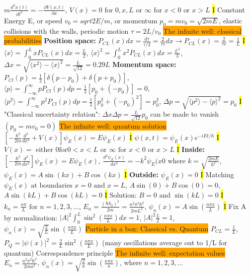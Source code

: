 \documentclass[fontsize=4pt]{scrartcl}
\begin{document}
$m\frac{d^2 x(t)}{dt^2} = -\frac{\partial V(x,t)}{\partial x}$, $V(x) = 0 \text{ for } 0,x,L \text{ or } \infty \text{ for } x<0 \text { or } x > L$
\hl{I} Constant Energy E, or speed $v_0 = sqrt{2E/m}$, or momentum $p_0 = mv_0 = \sqrt{2mE}$, elastic collisions with the walls, periodic motion $\tau = 2L/v_0$
\colorbox{Orange}{The infinite well: classical probabilities}
\textbf{Position space: }
$P_{CL}(x)dx = \frac{d\tau}{\tau / 2} = \frac{2}{\tau v}dx \rightarrow P_{CL}(x) = \frac{2}{\tau v} = \frac{1}{L}$
\hl{I}
$\langle x \rangle = \int_{0}^{L} x P_{CL}(x)dx = \frac{L}{2}$, $\langle x \rangle^2 = \int_{0}^{L} x^2 P_{CL}(x)dx = \frac{L^2}{3}$, $\Delta x = \sqrt{\langle x^2 \rangle -\langle x \rangle^2} = \frac{L}{\sqrt{12}} = 0.29 L$ 
\textbf{Momentum space: }
$P_{Cl}(p) = \frac{1}{2}[\delta(p-p_0)+\delta(p+p_0)]$, $ \langle p \rangle = \int_{-\infty}^{\infty} p P_{Cl}(p)dp = \frac{1}{2}[p_0 + (-p_0)] = 0$, $ \langle p^2 \rangle = \int_{-\infty}^{\infty} p^2 P_{Cl}(p)dp = \frac{1}{2}[p_0^2 + (-p_0)^2] = p_0^2$, $\Delta p = \sqrt{\langle p^2 \rangle - \langle p \rangle^2} = p_0$
\hl{I}
"Classical uncertainty relation": $\Delta x \Delta p = \frac{L}{\sqrt{12}}p_0$ can be made to vanish $(p_0 = mv_0 = 0)$
\colorbox{Orange}{The infinite well: quantum solution}
$[-\frac{\hbar^2}{2m}\frac{d^2}{dx^2}+V(x)]\psi_E(x) = E\psi_E(x)$
\hl{I}
$\psi(x,t) = \psi_{E} (x) e^{-iEt/\hbar}$
\hl{I}
$V(x) = \text{ either } 0 \text {for} 0 < x < L \text{ or } \infty \text{ for } x < 0 \text{ or } x > L$
\hl{I}
\textbf{Inside:} $[-\frac{\hbar^2}{2m}\frac{d^2}{dx^2}]\psi_E  (x) = E\psi_E (x)$, $\frac{d^2 \psi_{E}(x)}{dx^2} = - k^2 \psi_E (x0 \text{ where } k = \sqrt{\frac{2mE}{\hbar^2}}$, $\psi_E(x) = A\sin(kx) + B\cos(kx)$
\hl{I}
\textbf{Outside:} $\psi_E(x) = 0$
\hl{I}
Matching $\psi_E(x) \text { at boundaries } x=0 \text{ and } x=L$, $A\sin(0) + B\cos(0) = 0$, $A\sin(kL) + B\cos(kL) = 0$
\hl{I}
Solution: $B=0 \text{ and } \sin(kL) = 0$
\hl{I}
$k_n = \frac{n\pi}{L} \text{ for } n = 1,2,3,...$, $E_n = \frac{(\hbar k_2)^2}{2m} = \frac{n^2 \pi^2 \hbar^2}{2mL^2}$, $\psi_n(x) = A\sin( \frac{n\pi x}{L})$
\hl{I}
Fix A by normalization: $|A|^2 \int_0^L \sin^2(\frac{n \pi x}{L})dx = 1$, $|A|^2 \frac{L}{2} = 1$, $\psi_n(x) = \sqrt{\frac{2}{L}}\sin(\frac{n\pi x}{L})$
\colorbox{Orange}{Particle in a box: Classical vs. Quantum}
$P_{CL} = \frac{1}{L}$, $P_{Q} = |\psi(x)|^2 = \frac{2}{L}\sin^2 (\frac{n\pi x}{L})$ (many oscillations average out to 1/L for quantum) Correspondence principle
\colorbox{Orange}{The infinite well: expectation values}
$E_n = \frac{n^2 \pi^2 \hbar^2}{2ma^2}$, $\psi_{n}(x) = \sqrt{\frac{2}{a}}\sin(\frac{n\pi x}{a})$, where $n=1,2,3,...$
\end{document}
